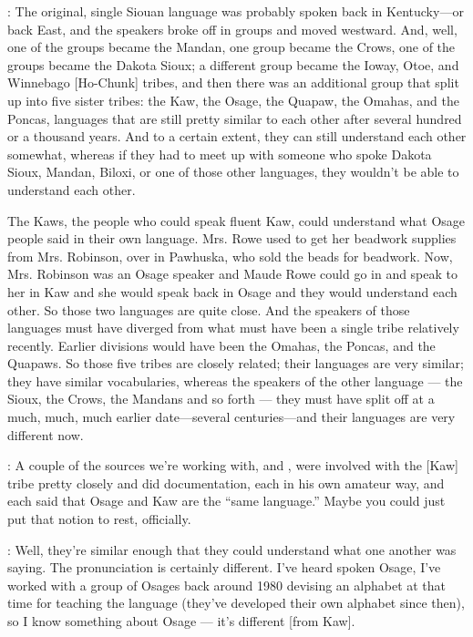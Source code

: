 \documentclass[output=paper]{LSP/langsci}
\begin{document}
: The original, single Siouan language was probably spoken back in Kentucky---or back East, and the speakers broke off in groups and moved westward. And, well, one of the groups became the Mandan, one group became the Crows, one of the groups became the Dakota Sioux; a different group became the Ioway, Otoe, and Winnebago [Ho-Chunk] tribes, and then there was an additional group that split up into five sister tribes: the Kaw, the Osage, the Quapaw, the Omahas, and the Poncas, languages that are still pretty similar to each other after several hundred or a thousand years. And to a certain extent, they can still understand each other somewhat, whereas if they had to meet up with someone who spoke Dakota Sioux, Mandan, Biloxi, or one of those other languages, they wouldn't be able to understand each other.

The Kaws, the people who could speak fluent Kaw, could understand what Osage people said in their own language. Mrs. Rowe used to get her beadwork supplies from Mrs. Robinson, over in Pawhuska, who sold the beads for beadwork. Now, Mrs. Robinson was an Osage speaker and Maude Rowe could go in and speak to her in Kaw and she would speak back in Osage and they would understand each other. So those two languages are quite close. And the speakers of those languages must have diverged from what must have been a single tribe relatively recently. Earlier divisions would have been the Omahas, the Poncas, and the Quapaws. So those five tribes are closely related; their languages are very similar; they have similar vocabularies, whereas the speakers of the other language --- the Sioux, the Crows, the Mandans and so forth --- they must have split off at a much, much, much earlier date---several centuries---and their languages are very different now.

: A couple of the sources we're working with,  and , were involved with the [Kaw] tribe pretty closely and did documentation, each in his own amateur way, and each said that Osage and Kaw are the ``same language.'' Maybe you could just put that notion to rest, officially.

: Well, they're similar enough that they could understand what one another was saying. The pronunciation is certainly different. I've heard spoken Osage, I've worked with a group of Osages back around 1980 devising an alphabet at that time for teaching the language (they've developed their own alphabet since then), so I know something about Osage --- it's different [from Kaw].
\end{document}
